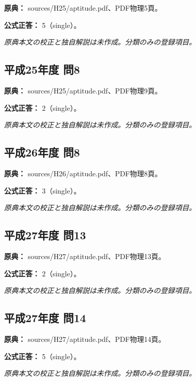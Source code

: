 \noindent\textbf{原典：} sources/H25/aptitude.pdf、PDF物理5頁。

\textbf{公式正答：} 5（single）。

\par\textit{原典本文の校正と独自解説は未作成。分類のみの登録項目。}

\subsection{平成25年度 問8}
\label{q:h25-reg-apt-08}

\noindent\textbf{原典：} sources/H25/aptitude.pdf、PDF物理9頁。

\textbf{公式正答：} 2（single）。

\par\textit{原典本文の校正と独自解説は未作成。分類のみの登録項目。}

\subsection{平成26年度 問8}
\label{q:h26-reg-apt-08}

\noindent\textbf{原典：} sources/H26/aptitude.pdf、PDF物理8頁。

\textbf{公式正答：} 3（single）。

\par\textit{原典本文の校正と独自解説は未作成。分類のみの登録項目。}

\subsection{平成27年度 問13}
\label{q:h27-reg-apt-13}

\noindent\textbf{原典：} sources/H27/aptitude.pdf、PDF物理13頁。

\textbf{公式正答：} 2（single）。

\par\textit{原典本文の校正と独自解説は未作成。分類のみの登録項目。}

\subsection{平成27年度 問14}
\label{q:h27-reg-apt-14}

\noindent\textbf{原典：} sources/H27/aptitude.pdf、PDF物理14頁。

\textbf{公式正答：} 5（single）。

\par\textit{原典本文の校正と独自解説は未作成。分類のみの登録項目。}

